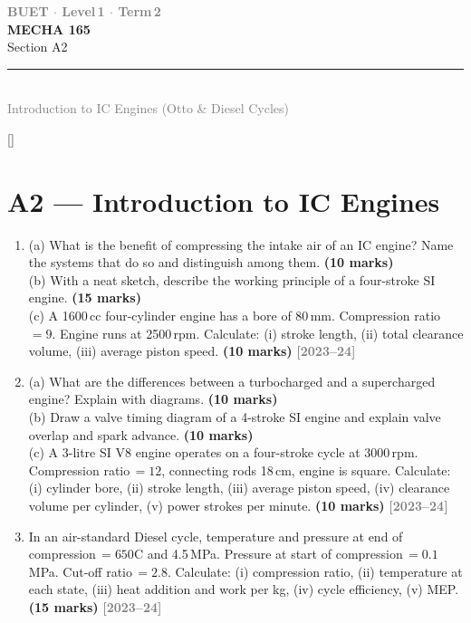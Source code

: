 \documentclass[12pt,a3paper]{article}
\newcommand{\yr}[1]{\hfill\textcolor{gray}{\small\textbf{[#1]}}}
\newcommand{\mk}[1]{\textcolor{orange!70!black}{\small\textbf{(#1 marks)}}}
\newcommand{\secdivider}[4]{%
  \newpage\thispagestyle{empty}%
  \vspace*{\fill}%
  \begin{tcolorbox}[enhanced,colback=#4!7,colframe=#3,boxrule=1.5pt,arc=8pt,
    left=20pt,right=20pt,top=22pt,bottom=22pt,
    shadow={3pt}{-3pt}{0pt}{black!15}]
    \centering
    {\large\textcolor{gray}{\textbf{BUET $\cdot$ Level\,1 $\cdot$ Term\,2}}}\\[8pt]
    {\fontsize{26}{32}\selectfont\bfseries\textcolor{#3}{MECHA 165}}\\[6pt]
    {\fontsize{15}{19}\selectfont\textcolor{dgray}{#1}}\\[12pt]
    \textcolor{#3!60}{\rule{0.5\textwidth}{0.5pt}}\\[6pt]
    {\small\textcolor{gray}{#2}}
  \end{tcolorbox}%
  \vspace*{\fill}\newpage%
}
\begin{document}
\secdivider{Section A2}{Introduction to IC Engines (Otto \& Diesel Cycles)}{cB}{cB}
\label{sec:A2}
\titleformat{\section}{\large\bfseries\color{cB}}{}{0em}{}[\titlerule]
\section{A2 --- Introduction to IC Engines}

\begin{enumerate}
\item \label{qlabel:A2-Q1}
(a) What is the benefit of compressing the intake air of an IC engine? Name the systems that do so and distinguish among them. \mk{10}\\
(b) With a neat sketch, describe the working principle of a four-stroke SI engine. \mk{15}\\
(c) A 1600\,cc four-cylinder engine has a bore of 80\,mm. Compression ratio $= 9$. Engine runs at 2500\,rpm. Calculate: (i) stroke length, (ii) total clearance volume, (iii) average piston speed. \mk{10}
\yr{2023--24}




\item \label{qlabel:A2-Q2}
(a) What are the differences between a turbocharged and a supercharged engine? Explain with diagrams. \mk{10}\\
(b) Draw a valve timing diagram of a 4-stroke SI engine and explain valve overlap and spark advance. \mk{10}\\
(c) A 3-litre SI V8 engine operates on a four-stroke cycle at 3000\,rpm. Compression ratio\,$= 12$, connecting rods 18\,cm, engine is square. Calculate: (i) cylinder bore, (ii) stroke length, (iii) average piston speed, (iv) clearance volume per cylinder, (v) power strokes per minute. \mk{10}
\yr{2023--24}




\item \label{qlabel:A2-Q12}
In an air-standard Diesel cycle, temperature and pressure at end of compression\,$= 650$\textdegree C and 4.5\,MPa. Pressure at start of compression\,$= 0.1$\,MPa. Cut-off ratio\,$= 2.8$. Calculate: (i) compression ratio, (ii) temperature at each state, (iii) heat addition and work per kg, (iv) cycle efficiency, (v) MEP. \mk{15}
\yr{2023--24}





\end{enumerate}
\end{document}
